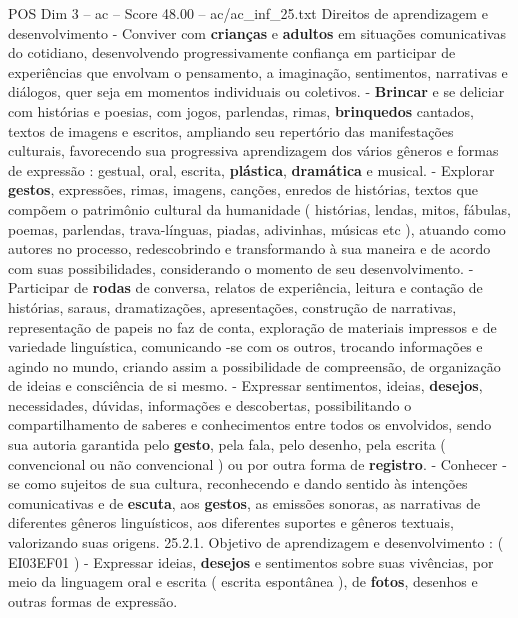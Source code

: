 \begin{textsample}{POS Dim 3 – ac – Score 48.00 – ac/ac\_inf\_25.txt}
Direitos de aprendizagem e desenvolvimento - Conviver com \textbf{crianças} e \textbf{adultos} em situações comunicativas do cotidiano, desenvolvendo progressivamente confiança em participar de experiências que envolvam o pensamento, a imaginação, sentimentos, narrativas e diálogos, quer seja em momentos individuais ou coletivos. - \textbf{Brincar} e se deliciar com histórias e poesias, com jogos, parlendas, rimas, \textbf{brinquedos} cantados, textos de imagens e escritos, ampliando seu repertório das manifestações culturais, favorecendo sua progressiva aprendizagem dos vários gêneros e formas de expressão : gestual, oral, escrita, \textbf{plástica}, \textbf{dramática} e musical. - Explorar \textbf{gestos}, expressões, rimas, imagens, canções, enredos de histórias, textos que compõem o patrimônio cultural da humanidade ( histórias, lendas, mitos, fábulas, poemas, parlendas, trava-línguas, piadas, adivinhas, músicas etc ), atuando como autores no processo, redescobrindo e transformando à sua maneira e de acordo com suas possibilidades, considerando o momento de seu desenvolvimento. - Participar de \textbf{rodas} de conversa, relatos de experiência, leitura e contação de histórias, saraus, dramatizações, apresentações, construção de narrativas, representação de papeis no faz de conta, exploração de materiais impressos e de variedade linguística, comunicando -se com os outros, trocando informações e agindo no mundo, criando assim a possibilidade de compreensão, de organização de ideias e consciência de si mesmo. - Expressar sentimentos, ideias, \textbf{desejos}, necessidades, dúvidas, informações e descobertas, possibilitando o compartilhamento de saberes e conhecimentos entre todos os envolvidos, sendo sua autoria garantida pelo \textbf{gesto}, pela fala, pelo desenho, pela escrita ( convencional ou não convencional ) ou por outra forma de \textbf{registro}. - Conhecer -se como sujeitos de sua cultura, reconhecendo e dando sentido às intenções comunicativas e de \textbf{escuta}, aos \textbf{gestos}, as emissões sonoras, as narrativas de diferentes gêneros linguísticos, aos diferentes suportes e gêneros textuais, valorizando suas origens. 25.2.1.
Objetivo de aprendizagem e desenvolvimento : ( EI03EF01 ) - Expressar ideias, \textbf{desejos} e sentimentos sobre suas vivências, por meio da linguagem oral e escrita ( escrita espontânea ), de \textbf{fotos}, desenhos e outras formas de expressão.

\end{textsample}
